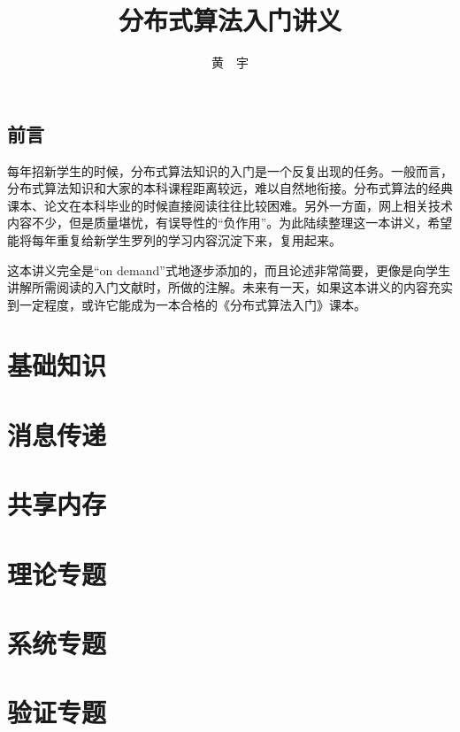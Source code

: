 \documentclass[UTF8]{ctexrep}
\begin{document}
\title{\Huge \bf 分布式算法入门讲义}

\author{黄\ \ 宇}

\maketitle

\tableofcontents

\chapter*{前言}

每年招新学生的时候，分布式算法知识的入门是一个反复出现的任务。一般而言，分布式算法知识和大家的本科课程距离较远，难以自然地衔接。分布式算法的经典课本、论文在本科毕业的时候直接阅读往往比较困难。另外一方面，网上相关技术内容不少，但是质量堪忧，有误导性的“负作用”。为此陆续整理这一本讲义，希望能将每年重复给新学生罗列的学习内容沉淀下来，复用起来。

这本讲义完全是“on demand”式地逐步添加的，而且论述非常简要，更像是向学生讲解所需阅读的入门文献时，所做的注解。未来有一天，如果这本讲义的内容充实到一定程度，或许它能成为一本合格的《分布式算法入门》课本。

\part{基础知识}

 


\part{消息传递}

 

 

\part{共享内存}

 

\part{理论专题}

 


\part{系统专题}

 

 

\part{验证专题}

 

 






\end{document}
